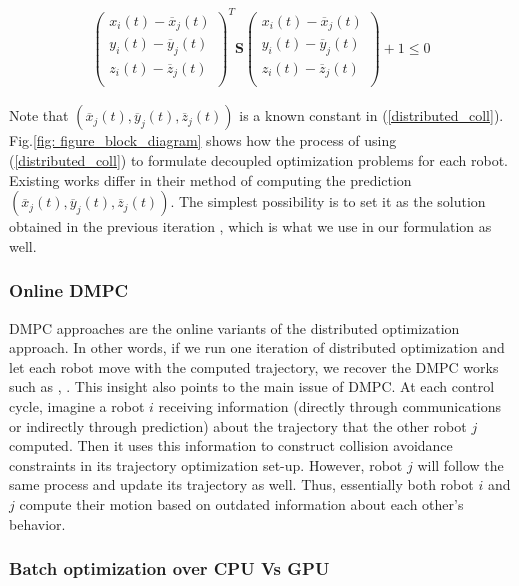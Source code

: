 \begin{align}
    \left(\begin{matrix}
    x_i(t)-\overline{x}_j(t)\\
 y_i(t)-\overline{y}_j(t)\\
 z_i(t)-\overline{z}_j(t)\\
 \end{matrix}\right)^T\textbf{S}\left(\begin{matrix}
 x_i(t)-\overline{x}_j(t)\\
 y_i(t)-\overline{y}_j(t)\\
 z_i(t)-\overline{z}_j(t)\\
 \end{matrix}\right)+1 \leq 0
 \label{distributed_coll}
\end{align}

\noindent Note that $(\overline{x}_j(t), \overline{y}_j(t), \overline{z}_j(t) )$ is a known constant in (\ref{distributed_coll}). Fig.\ref{fig: figure_block_diagram} shows how the process of using (\ref{distributed_coll}) to formulate decoupled optimization problems for each robot. Existing works differ in their method of computing the prediction $(\overline{x}_j(t), \overline{y}_j(t), \overline{z}_j(t) )$. The simplest possibility is to set it as the solution obtained in the previous iteration \citep{alonso_mora_nips_multi}, which is what we use in our formulation as well.

\subsubsection{Online DMPC} 
\noindent DMPC approaches are the online variants of the distributed optimization approach. In other words, if we run one iteration of distributed optimization and let each robot move with the computed trajectory, we recover the DMPC works such as \citep{dmpc_carlos}, \cite{dmpc_carlos_2}. This insight also points to the main issue of DMPC. At each control cycle, imagine a robot $i$ receiving information (directly through communications or indirectly through prediction) about the trajectory that the other robot $j$ computed. Then it uses this information to construct collision avoidance constraints in its trajectory optimization set-up. However, robot $j$ will follow the same process and update its trajectory as well. Thus, essentially both robot $i$ and $j$ compute their motion based on outdated information about each other's behavior.

\subsubsection{Batch optimization over CPU Vs GPU}

